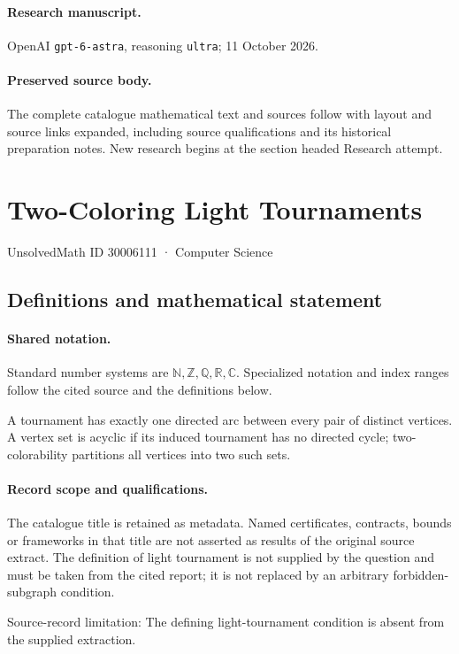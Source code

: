 \documentclass[11pt]{article}
\begin{document}
\paragraph{Research manuscript.} OpenAI \texttt{gpt-6-astra}, reasoning \texttt{ultra}; 11 October 2026.
\paragraph{Preserved source body.} The complete catalogue mathematical text and sources follow with layout and source links expanded, including source qualifications and its historical preparation notes. New research begins at the section headed Research attempt.

\section{Two-Coloring Light Tournaments}\label{30006111}
{\small UnsolvedMath ID 30006111 · Computer Science}
\subsection{Definitions and mathematical statement}

\paragraph{Shared notation.}Standard number systems are $\mathbb N,\mathbb Z,\mathbb Q,\mathbb R,\mathbb C$. Specialized notation and index ranges follow the cited source and the definitions below.


A tournament has exactly one directed arc between every pair of distinct vertices. A vertex set is acyclic if its induced tournament has no directed cycle; two-colorability partitions all vertices into two such sets.
\paragraph{Record scope and qualifications.}
The catalogue title is retained as metadata. Named certificates, contracts, bounds or frameworks in that title are not asserted as results of the original source extract.
The definition of light tournament is not supplied by the question and must be taken from the cited report; it is not replaced by an arbitrary forbidden-subgraph condition.

Source-record limitation: The defining light-tournament condition is absent from the supplied extraction.
\end{document}
